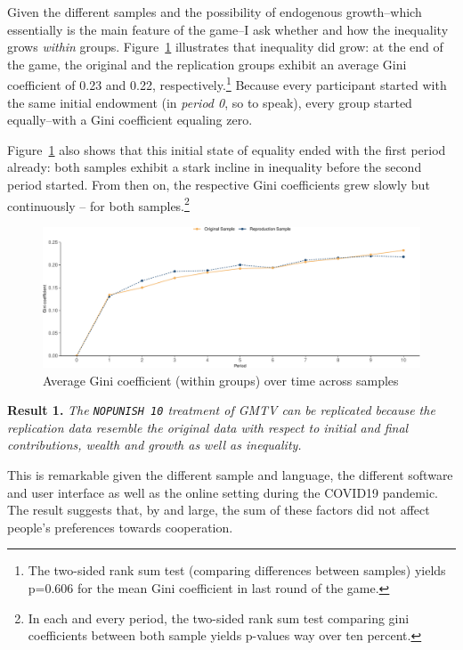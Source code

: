 \documentclass[
  authoryear,
  review,
  3p,
  onecolumn]{elsarticle}
\begin{document}
Given the different samples and the possibility of endogenous
growth--which essentially is the main feature of the game--I ask whether
and how the inequality grows \emph{within} groups.
Figure~\ref{fig-gini-time-series} illustrates that inequality did grow:
at the end of the game, the original and the replication groups exhibit
an average Gini coefficient of 0.23 and 0.22, respectively.\footnote{The
  two-sided rank sum test (comparing differences between samples) yields
  p=0.606 for the mean Gini coefficient in last round of the game.}
Because every participant started with the same initial endowment (in
\emph{period 0}, so to speak), every group started equally--with a Gini
coefficient equaling zero.

Figure~\ref{fig-gini-time-series} also shows that this initial state of
equality ended with the first period already: both samples exhibit a
stark incline in inequality before the second period started. From then
on, the respective Gini coefficients grew slowly but continuously -- for
both samples.\footnote{In each and every period, the two-sided rank sum
  test comparing gini coefficients between both sample yields p-values
  way over ten percent.}

\begin{figure}

{\centering \includegraphics{paper_files/figure-pdf/fig-gini-time-series-1.pdf}

}

\caption{\label{fig-gini-time-series}Average Gini coefficient (within
groups) over time across samples}

\end{figure}

\textbf{Result 1.} \emph{The \texttt{NOPUNISH\ 10} treatment of GMTV can
be replicated because the replication data resemble the original data
with respect to initial and final contributions, wealth and growth as
well as inequality.}

This is remarkable given the different sample and language, the
different software and user interface as well as the online setting
during the COVID19 pandemic. The result suggests that, by and large, the
sum of these factors did not affect people's preferences towards
cooperation.
\end{document}
